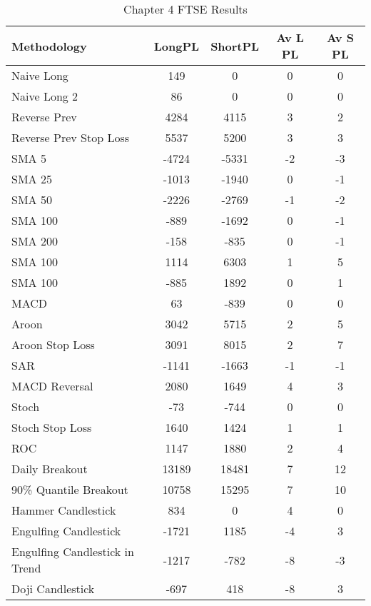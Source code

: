 \begin{table}[ht]
\centering
\caption[Chapter 4 FTSE Results]{Chapter 4 FTSE Results} 
\label{tab:chp6:ftse_summary}
\begin{tabular}{lcccc}
  \toprule Methodology & LongPL & ShortPL & Av L PL & Av S PL \\ 
  \midrule Naive Long & 149 & 0 & 0 & 0 \\ 
  Naive Long 2 & 86 & 0 & 0 & 0 \\ 
  Reverse Prev & 4284 & 4115 & 3 & 2 \\ 
  Reverse Prev Stop Loss & 5537 & 5200 & 3 & 3 \\ 
  SMA 5 & -4724 & -5331 & -2 & -3 \\ 
  SMA 25 & -1013 & -1940 & 0 & -1 \\ 
  SMA 50 & -2226 & -2769 & -1 & -2 \\ 
  SMA 100 & -889 & -1692 & 0 & -1 \\ 
  SMA 200 & -158 & -835 & 0 & -1 \\ 
  SMA 100 & 1114 & 6303 & 1 & 5 \\ 
  SMA 100 & -885 & 1892 & 0 & 1 \\ 
  MACD & 63 & -839 & 0 & 0 \\ 
  Aroon & 3042 & 5715 & 2 & 5 \\ 
  Aroon Stop Loss & 3091 & 8015 & 2 & 7 \\ 
  SAR & -1141 & -1663 & -1 & -1 \\ 
  MACD Reversal & 2080 & 1649 & 4 & 3 \\ 
  Stoch & -73 & -744 & 0 & 0 \\ 
  Stoch Stop Loss & 1640 & 1424 & 1 & 1 \\ 
  ROC & 1147 & 1880 & 2 & 4 \\ 
  Daily Breakout & 13189 & 18481 & 7 & 12 \\ 
  90\% Quantile Breakout & 10758 & 15295 & 7 & 10 \\ 
  Hammer Candlestick & 834 & 0 & 4 & 0 \\ 
  Engulfing Candlestick & -1721 & 1185 & -4 & 3 \\ 
  Engulfing Candlestick in Trend & -1217 & -782 & -8 & -3 \\ 
  Doji Candlestick & -697 & 418 & -8 & 3 \\ 
   \bottomrule \end{tabular}
\end{table}
